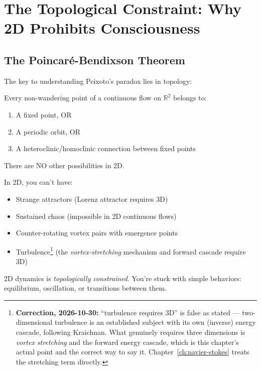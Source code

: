 \section{The Topological Constraint: Why 2D Prohibits Consciousness}

\subsection{The Poincaré-Bendixson Theorem}

The key to understanding Peixoto's paradox lies in topology:

\begin{thm}\label{thm:poincare-bendixson}
Every non-wandering point of a continuous flow on $\mathbb{R}^2$ belongs to:
\begin{enumerate}
\item A fixed point, OR
\item A periodic orbit, OR
\item A heteroclinic/homoclinic connection between fixed points
\end{enumerate}

There are NO other possibilities in 2D.
\end{thm}



\begin{intuitive}
In 2D, you can't have:
\begin{itemize}
\item Strange attractors (Lorenz attractor requires 3D)
\item Sustained chaos (impossible in 2D continuous flows)
\item Counter-rotating vortex pairs with emergence points
\item Turbulence\footnote{\textbf{Correction, 2026-10-30:} ``turbulence requires
3D'' is false as stated --- two-dimensional turbulence is an established subject
with its own (inverse) energy cascade, following Kraichnan. What genuinely
requires three dimensions is \emph{vortex stretching} and the forward energy
cascade, which is this chapter's actual point and the correct way to say it.
Chapter~\ref{ch:navier-stokes} treats the stretching term directly.} (the
\emph{vortex-stretching} mechanism and forward cascade require 3D)
\end{itemize}

2D dynamics is \textit{topologically constrained}. You're stuck with simple behaviors: equilibrium, oscillation, or transitions between them.
\end{intuitive}

